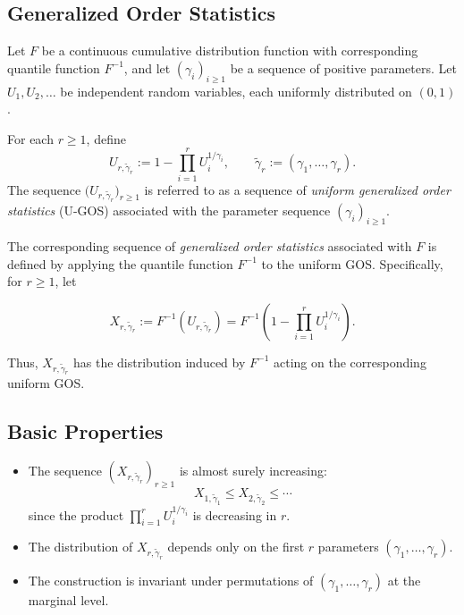 \documentclass[authoryear,preprint,3p,review,10pt]{elsarticle}
\theoremstyle{definition}
\begin{document}
	\subsection*{Generalized Order Statistics}
	
	Let \(F\) be a continuous cumulative distribution function with corresponding quantile function \(F^{-1}\), and let \((\gamma_i)_{i\geq 1}\) be a sequence of positive parameters. Let \(U_1,U_2,\ldots\) be independent random variables, each uniformly distributed on \((0,1)\).
	
	For each \(r\geq 1\), define
	\[
	U_{r,\tilde{\gamma}_r}
	:=1-\prod_{i=1}^{r}U_i^{1/\gamma_i},
	\qquad
	\tilde{\gamma}_r:=(\gamma_1,\ldots,\gamma_r).
	\]
	The sequence \(\bigl(U_{r,\tilde{\gamma}_r}\bigr)_{r\geq 1}\) is referred to as a sequence of \textit{uniform generalized order statistics} (U-GOS) associated with the parameter sequence \((\gamma_i)_{i\geq 1}\).
	
	The corresponding sequence of \textit{generalized order statistics} associated with \(F\) is defined by applying the quantile function \(F^{-1}\) to the uniform GOS. Specifically, for \(r\geq 1\), let
	
	\begin{equation}\label{GOS}
		X_{r,\tilde{\gamma}_r}
		:=F^{-1}\!\left(U_{r,\tilde{\gamma}_r}\right)
		=F^{-1}\!\left(
		1-\prod_{i=1}^{r}U_i^{1/\gamma_i}
		\right).
	\end{equation}
	
	Thus, \(X_{r,\tilde{\gamma}_r}\) has the distribution induced by \(F^{-1}\) acting on the corresponding uniform GOS.
	
	
	
	\subsection*{Basic Properties}
	
	\begin{itemize}
		\item The sequence $(X_{r,\tilde{\gamma}_r})_{r \ge 1}$ is almost surely increasing:
		\[
		X_{1,\tilde{\gamma}_1} \le X_{2,\tilde{\gamma}_2} \le \cdots
		\]
		since the product $\prod_{i=1}^{r} U_i^{1/\gamma_i}$ is decreasing in $r$.
		
		\item The distribution of $X_{r,\tilde{\gamma}_r}$ depends only on the first $r$ parameters $(\gamma_1,\dots,\gamma_r)$.
		
		\item The construction is invariant under permutations of $(\gamma_1,\dots,\gamma_r)$ at the marginal level.
	\end{itemize}
	
\end{document}
